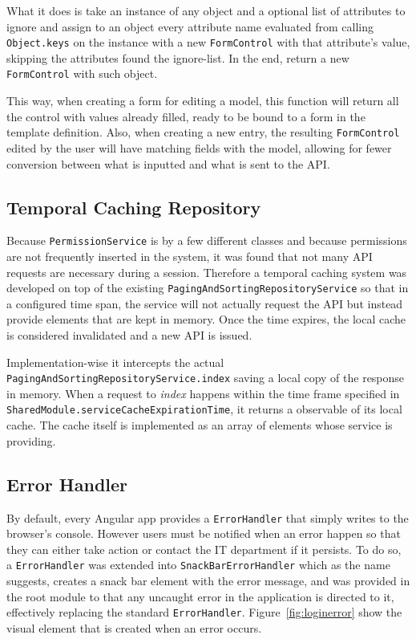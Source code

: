 What it does is take an instance of any object and a optional list of attributes to ignore and assign to an object every attribute name evaluated from calling \texttt{Object.keys} on the instance with a new \texttt{FormControl} with that attribute's value, skipping the attributes found the ignore-list. In the end, return a new \texttt{FormControl} with such object.

This way, when creating a form for editing a model, this function will return all the control with values already filled, ready to be bound to a form in the template definition. Also, when creating a new entry, the resulting \texttt{FormControl} edited by the user will have matching fields with the model, allowing for fewer conversion between what is inputted and what is sent to the \gls{API}.

\subsection{Temporal Caching Repository}
Because \texttt{PermissionService} is by a few different classes and because permissions are not frequently inserted in the system, it was found that not many \gls{API} requests are necessary during a session. Therefore a temporal caching system was developed on top of the existing \texttt{PagingAndSortingRepositoryService} so that in a configured time span, the service will not actually request the \gls{API} but instead provide elements that are kept in memory. Once the time expires, the local cache is considered invalidated and a new \gls{API} is issued.

Implementation-wise it intercepts the actual \texttt{PagingAndSortingRepositoryService.index} saving a local copy of the response in memory. When a request to \textit{index} happens within the time frame specified in \texttt{SharedModule.serviceCacheExpirationTime}, it returns a observable of its local cache. The cache itself is implemented as an array of elements whose service is providing.

\subsection{Error Handler}
By default, every Angular app provides a \texttt{ErrorHandler} that simply writes to the browser's console. However users must be notified when an error happen so that they can either take action or contact the IT department if it persists. To do so, a \texttt{ErrorHandler} was extended into \texttt{SnackBarErrorHandler} which as the name suggests, creates a snack bar element with the error message, and was provided in the root module to that any uncaught error in the application is directed to it, effectively replacing the standard \texttt{ErrorHandler}. Figure~\ref{fig:loginerror} show the visual element that is created when an error occurs.

